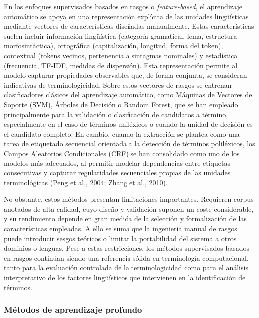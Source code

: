 En los enfoques supervisados basados en rasgos o \textit{feature-based}, el aprendizaje automático se apoya en una representación explícita de las unidades lingüísticas mediante vectores de características diseñadas manualmente. Estas características suelen incluir información lingüística (categoría gramatical, lema, estructura morfosintáctica), ortográfica (capitalización, longitud, forma del token), contextual (tokens vecinos, pertenencia a sintagmas nominales) y estadística (frecuencia, TF-IDF, medidas de dispersión). Esta representación permite al modelo capturar propiedades observables que, de forma conjunta, se consideran indicativas de terminologicidad. Sobre estos vectores de rasgos se entrenan clasificadores clásicos del aprendizaje automático, como Máquinas de Vectores de Soporte (SVM), Árboles de Decisión o Random Forest, que se han empleado principalmente para la validación o clasificación de candidatos a término, especialmente en el caso de términos uniléxicos o cuando la unidad de decisión es el candidato completo. En cambio, cuando la extracción se plantea como una tarea de etiquetado secuencial orientada a la detección de términos poliléxicos, los Campos Aleatorios Condicionales (CRF) se han consolidado como uno de los modelos más adecuados, al permitir modelar dependencias entre etiquetas consecutivas y capturar regularidades secuenciales propias de las unidades terminológicas (Peng et al., 2004; Zhang et al., 2010).

No obstante, estos métodos presentan limitaciones importantes. Requieren corpus anotados de alta calidad, cuyo diseño y validación suponen un coste considerable, y su rendimiento depende en gran medida de la selección y formalización de las características empleadas. A ello se suma que la ingeniería manual de rasgos puede introducir sesgos teóricos o limitar la portabilidad del sistema a otros dominios o lenguas. Pese a estas restricciones, los métodos supervisados basados en rasgos continúan siendo una referencia sólida en terminología computacional, tanto para la evaluación controlada de la terminologicidad como para el análisis interpretativo de los factores lingüísticos que intervienen en la identificación de términos.

\subsubsection{Métodos de aprendizaje profundo}

